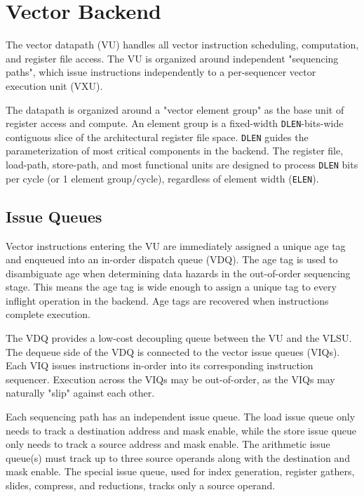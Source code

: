 \newpage
\section{Vector Backend}
\label{sec:execute}


The vector datapath (VU) handles all vector instruction scheduling, computation, and register file access.
The VU is organized around independent "sequencing paths", which issue instructions independently to a per-sequencer vector execution unit (VXU).

The datapath is organized around a "vector element group" as the base unit of register access and compute.
An element group is a fixed-width \texttt{DLEN}-bits-wide contiguous slice of the architectural register file space.
\texttt{DLEN} guides the parameterization of most critical components in the backend.
The register file, load-path, store-path, and most functional units are designed to process \texttt{DLEN} bits per cycle (or 1 element group/cycle), regardless of element width (\texttt{ELEN}).

\subsection{Issue Queues}

Vector instructions entering the VU are immediately assigned a unique age tag and enqueued into an in-order dispatch queue (VDQ).
The age tag is used to disambiguate age when determining data hazards in the out-of-order sequencing stage.
This means the age tag is wide enough to assign a unique tag to every inflight operation in the backend.
Age tags are recovered when instructions complete execution.

The VDQ provides a low-cost decoupling queue between the VU and the VLSU.
The dequeue side of the VDQ is connected to the vector issue queues (VIQs).
Each VIQ issues instructions in-order into its corresponding instruction sequencer.
Execution across the VIQs may be out-of-order, as the VIQs may naturally "slip" against each other.

Each sequencing path has an independent issue queue.
The load issue queue only needs to track a destination address and mask enable, while the store issue queue only needs to track a source address and mask enable.
The arithmetic issue queue(s) must track up to three source operands along with the destination and mask enable.
The special issue queue, used for index generation, register gathers, slides, compress, and reductions, tracks only a source operand.

